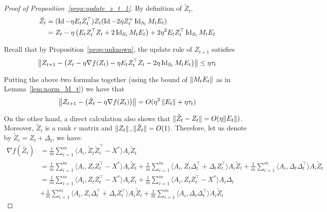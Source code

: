 \begin{proof}[Proof of Proposition~\ref{prop:update_z_t_1}]
By definition of $\tilde{Z}_t$, 
\begin{align}
\tilde{Z}_t &=  (\operatorname{Id} -  \eta E_t Z_t^{\top})Z_t ( \operatorname{Id} -  2 \eta Z_t^{+} \operatorname{Id}_{S_t} M_t E_t )
\\
&= Z_t - \eta \left( E_t Z_t^{\top} Z_t + 2 \operatorname{Id}_{S_t} M_t E_t \right) + 2 \eta^2  E_t Z_t^{\top} \operatorname{Id}_{S_t} M_t E_t
\end{align}

Recall that by Proposition~\ref{prop:unknown}, the update rule of $Z_{t + 1}$ satisfies 
\begin{align}
\left\|Z_{t + 1} - \left(Z_t  - \eta \nabla f(Z_t)- \eta E_t Z_t^{\top} Z_t - 2 \eta\operatorname{Id}_{S_t} M_t E_t  \right)\right\| \leq \eta \tau_t\nonumber
\end{align}

Putting the above two formulas together (using the bound of $\left\|M_t E_t\right\|$ as in Lemma~\ref{lem:norm_M_t}) we have that
\begin{align}
\left\|Z_{t + 1} - \left(\tilde{Z}_t - \eta \nabla f(Z_t) \right)\right\| = O(\eta^2 \left\|E_t\right\|+  \eta \tau_t)
\end{align}

On the other hand, a direct calculation also shows that $\|\tilde{Z}_t - Z_t\| = O(\eta \|E_t\|)$. Moreover, $\tilde{Z}_t$ is a rank $r$ matrix and $\left\|Z_t\right\|, \|\tilde{Z}_t\| = O(1)$. Therefore, let us denote by $\tilde{Z}_t = Z_t + \Delta_t$, we have:
\begin{align*}
 \nabla f(\tilde{Z_t}) &= \frac{1}{m}  \sum_{i = 1}^m \langle A_i, \tilde{Z}_t \tilde{Z}_t^{\top}  - X^* \rangle A_i \tilde{Z}_t 
\\
& = \frac{1}{m}  \sum_{i = 1}^m \langle A_i, Z_t Z_t^{\top}  - X^* \rangle A_i \tilde{Z}_t  +  \frac{1}{m}  \sum_{i = 1}^m \langle A_i, Z_t \Delta_t^{\top} + \Delta_t Z_t^{\top} \rangle A_i \tilde{Z}_t  +  \frac{1}{m}  \sum_{i = 1}^m \langle A_i, \Delta_t \Delta_t^{\top} \rangle A_i \tilde{Z}_t 
\\
&= \frac{1}{m}  \sum_{i = 1}^m \langle A_i, Z_t Z_t^{\top}  - X^* \rangle A_i Z_t+  \frac{1}{m}  \sum_{i = 1}^m \langle A_i, Z_t Z_t^{\top}  - X^* \rangle A_i  \Delta_t
\\
&+  \frac{1}{m}  \sum_{i = 1}^m \langle A_i, Z_t \Delta_t^{\top} + \Delta_t Z_t^{\top} \rangle A_i \tilde{Z}_t  +  \frac{1}{m}  \sum_{i = 1}^m \langle A_i, \Delta_t \Delta_t^{\top} \rangle A_i \tilde{Z}_t 
\end{align*}



\end{proof}
